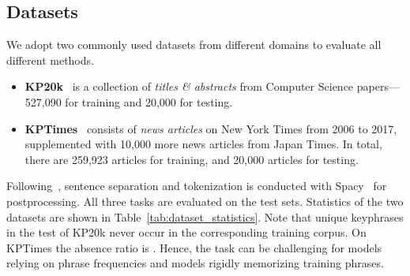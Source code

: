 \documentclass[sigconf]{acmart}
\begin{document}
\subsection{Datasets}
\label{sec:dataset}

We adopt two commonly used datasets from different domains to evaluate all different methods.
\begin{itemize}[nosep,leftmargin=*]
\item \textbf{KP20k}~\cite{meng2017deep} is a collection of 
\emph{titles \& abstracts} from Computer Science papers---527,090 for training and 20,000 for testing.
\item \textbf{KPTimes}~\cite{gallina2019kptimes} consists of \emph{news articles} on New York Times from 2006 to 2017, supplemented with 10,000 more news articles from Japan Times.
In total, there are 259,923 articles for training, and 20,000 articles for testing.
\end{itemize}

\noindent 
Following~\citet{gururangan2020don}, sentence separation and tokenization is conducted with Spacy~\cite{spacy} for postprocessing.
All three tasks are evaluated on the test sets. 
Statistics of the two datasets are shown in Table~\ref{tab:dataset_statistics}.
Note that  unique keyphrases in the test of KP20k never occur in the corresponding training corpus.
On KPTimes the absence ratio is .
Hence, the task can be challenging for models relying on phrase frequencies and models rigidly memorizing training phrases.
\end{document}
